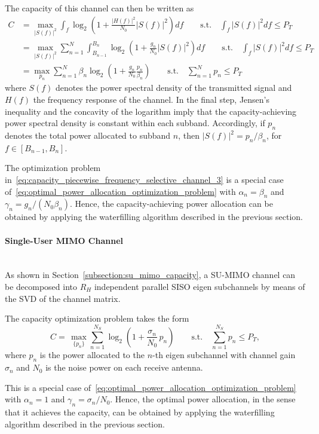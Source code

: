 The capacity of this channel can then be written as
\begin{subequations}
\label{eq:capacity_piecewise_frequency_selective_channel}
\begin{align}
    C
    &= \max_{|S(f)|^2} \int_f \log_2 \left( 1 + \frac{|H(f)|^2}{N_0} |S(f)|^2 \right) df
    \qquad \text{s.t.} \quad \int_f |S(f)|^2 df \leq P_T
    \label{eq:capacity_piecewise_frequency_selective_channel_1} \\
    &= \max_{|S(f)|^2} \sum_{n=1}^{N} \int_{B_{n-1}}^{B_n}
    \log_2 \left( 1 + \frac{g_n}{N_0} |S(f)|^2 \right) df
    \qquad \text{s.t.} \quad \int_f |S(f)|^2 df \leq P_T
    \label{eq:capacity_piecewise_frequency_selective_channel_2} \\
    &= \max_{p_n} \sum_{n=1}^{N} \beta_n \log_2 \left( 1 + \frac{g_n}{N_0} \frac{p_n}{\beta_n} \right)
    \qquad \text{s.t.} \quad \sum_{n=1}^{N} p_n \leq P_T
    \label{eq:capacity_piecewise_frequency_selective_channel_3}
\end{align}
\end{subequations}
where $S(f)$ denotes the power spectral density of the transmitted signal and $H(f)$ the frequency response of the channel.
In the final step, Jensen's inequality and the concavity of the logarithm imply that the capacity-achieving power spectral density is constant within each subband. Accordingly, if $p_n$ denotes the total power allocated to subband $n$, then $|S(f)|^2 = p_n / \beta_n$, for $f \in [B_{n-1}, B_n]$.

The optimization problem in~\eqref{eq:capacity_piecewise_frequency_selective_channel_3} is a special case of~\eqref{eq:optimal_power_allocation_optimization_problem} with $\alpha_n = \beta_n$ and $\gamma_n = g_n / (N_0 \beta_n)$.
Hence, the capacity-achieving power allocation can be obtained by applying the waterfilling algorithm described in the previous section.


\paragraph{Single-User MIMO Channel}~\\
As shown in Section~\ref{subsection:su_mimo_capacity}, a \ac{SU}-\ac{MIMO} channel can be decomposed into $R_H$ independent parallel \ac{SISO} eigen subchannels by means of the \ac{SVD} of the channel matrix.

The capacity optimization problem takes the form
\begin{equation*}
    C = \, \max_{\{p_n\}} \sum_{n=1}^{N_S} \log_2 \!\left( 1 + \frac{\sigma_n}{N_0} \, p_n \right)
    \qquad \text{s.t.} \quad \sum_{n=1}^{N_S} p_n \leq P_T,
\end{equation*}
where $p_n$ is the power allocated to the $n$-th eigen subchannel with channel gain $\sigma_n$ and $N_0$ is the noise power on each receive antenna.

This is a special case of~\eqref{eq:optimal_power_allocation_optimization_problem} with $\alpha_n = 1$ and $\gamma_n = \sigma_n / N_0$.
Hence, the optimal power allocation, in the sense that it achieves the capacity, can be obtained by applying the waterfilling algorithm described in the previous section.
